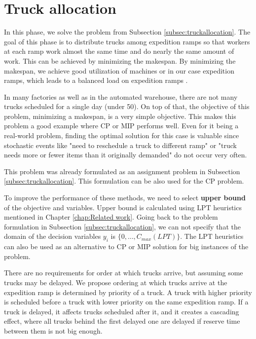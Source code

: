 \documentclass{ctuthesis}
\begin{document}
\section{Truck allocation}
\label{sec:truckallocationprop}
In this phase, we solve the problem from Subsection \ref{subsec:truckallocation}. The goal of this phase is to distribute trucks among expedition ramps so that workers at each ramp work almost the same time and do nearly the same amount of work. This can be achieved by minimizing the makespan. By minimizing the makespan, we achieve good utilization of machines or in our case expedition ramps, which leads to a balanced load on expedition ramps \cite{pinedo}. 

In many factories as well as in the automated warehouse, there are not many trucks scheduled for a single day (under 50). On top of that, the objective of this problem, minimizing a makespan, is a very simple objective. This makes this problem a good example where CP or MIP performs well. Even for it being a real-world problem, finding the optimal solution for this case is valuable since stochastic events like "need to reschedule a truck to different ramp" or "truck needs more or fewer items than it originally demanded" do not occur very often.

This problem was already formulated as an assignment problem in Subsection \ref{subsec:truckallocation}. This formulation can be also used for the CP problem.

To improve the performance of these methods, we need to select \textbf{upper bound} of the objective and variables. Upper bound is calculated using LPT heuristics mentioned in Chapter \ref{chap:Related work}. Going back to the problem formulation in Subsection \ref{subsec:truckallocation}, we can not specify that the domain of the decision variables $y_i$ is $\{0, \ldots, C_{max}(LPT)\}$. The LPT heuristics can also be used as an alternative to CP or MIP solution for big instances of the problem.

There are no requirements for order at which trucks arrive, but assuming some trucks may be delayed. We propose ordering at which trucks arrive at the expedition ramp is determined by priority of a truck. A truck with higher priority is scheduled before a truck with lower priority on the same expedition ramp. If a truck is delayed, it affects trucks scheduled after it, and it creates a cascading effect, where all trucks behind the first delayed one are delayed if reserve time between them is not big enough.
\end{document}

